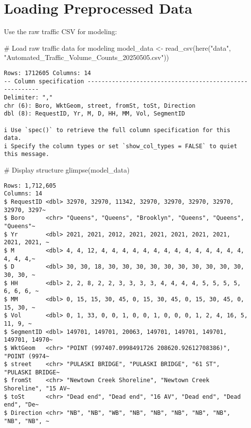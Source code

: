 \documentclass[
  letterpaper,
  DIV=11,
  numbers=noendperiod]{scrreprt}
\newenvironment{Shaded}{\begin{snugshade}}{\end{snugshade}}
\newcommand{\CommentTok}[1]{\textcolor[rgb]{0.37,0.37,0.37}{#1}}
\newcommand{\FunctionTok}[1]{\textcolor[rgb]{0.28,0.35,0.67}{#1}}
\newcommand{\NormalTok}[1]{\textcolor[rgb]{0.00,0.23,0.31}{#1}}
\newcommand{\OtherTok}[1]{\textcolor[rgb]{0.00,0.23,0.31}{#1}}
\newcommand{\StringTok}[1]{\textcolor[rgb]{0.13,0.47,0.30}{#1}}
\begin{document}
\section{Loading Preprocessed Data}\label{loading-preprocessed-data}

Use the raw traffic CSV for modeling:

\begin{Shaded}
\begin{Highlighting}[]
\CommentTok{\# Load raw traffic data for modeling}
\NormalTok{model\_data }\OtherTok{\textless{}{-}} \FunctionTok{read\_csv}\NormalTok{(}\FunctionTok{here}\NormalTok{(}\StringTok{"data"}\NormalTok{, }\StringTok{"Automated\_Traffic\_Volume\_Counts\_20250505.csv"}\NormalTok{))}
\end{Highlighting}
\end{Shaded}

\begin{verbatim}
Rows: 1712605 Columns: 14
-- Column specification --------------------------------------------------------
Delimiter: ","
chr (6): Boro, WktGeom, street, fromSt, toSt, Direction
dbl (8): RequestID, Yr, M, D, HH, MM, Vol, SegmentID

i Use `spec()` to retrieve the full column specification for this data.
i Specify the column types or set `show_col_types = FALSE` to quiet this message.
\end{verbatim}

\begin{Shaded}
\begin{Highlighting}[]
\CommentTok{\# Display structure}
\FunctionTok{glimpse}\NormalTok{(model\_data)}
\end{Highlighting}
\end{Shaded}

\begin{verbatim}
Rows: 1,712,605
Columns: 14
$ RequestID <dbl> 32970, 32970, 11342, 32970, 32970, 32970, 32970, 32970, 3297~
$ Boro      <chr> "Queens", "Queens", "Brooklyn", "Queens", "Queens", "Queens"~
$ Yr        <dbl> 2021, 2021, 2012, 2021, 2021, 2021, 2021, 2021, 2021, 2021, ~
$ M         <dbl> 4, 4, 12, 4, 4, 4, 4, 4, 4, 4, 4, 4, 4, 4, 4, 4, 4, 4, 4, 4,~
$ D         <dbl> 30, 30, 18, 30, 30, 30, 30, 30, 30, 30, 30, 30, 30, 30, 30, ~
$ HH        <dbl> 2, 2, 8, 2, 2, 3, 3, 3, 3, 4, 4, 4, 4, 5, 5, 5, 5, 6, 6, 6, ~
$ MM        <dbl> 0, 15, 15, 30, 45, 0, 15, 30, 45, 0, 15, 30, 45, 0, 15, 30, ~
$ Vol       <dbl> 0, 1, 33, 0, 0, 1, 0, 0, 1, 0, 0, 0, 1, 2, 4, 16, 5, 11, 9, ~
$ SegmentID <dbl> 149701, 149701, 20063, 149701, 149701, 149701, 149701, 14970~
$ WktGeom   <chr> "POINT (997407.0998491726 208620.92612708386)", "POINT (9974~
$ street    <chr> "PULASKI BRIDGE", "PULASKI BRIDGE", "61 ST", "PULASKI BRIDGE~
$ fromSt    <chr> "Newtown Creek Shoreline", "Newtown Creek Shoreline", "15 AV~
$ toSt      <chr> "Dead end", "Dead end", "16 AV", "Dead end", "Dead end", "De~
$ Direction <chr> "NB", "NB", "WB", "NB", "NB", "NB", "NB", "NB", "NB", "NB", ~
\end{verbatim}
\end{document}
